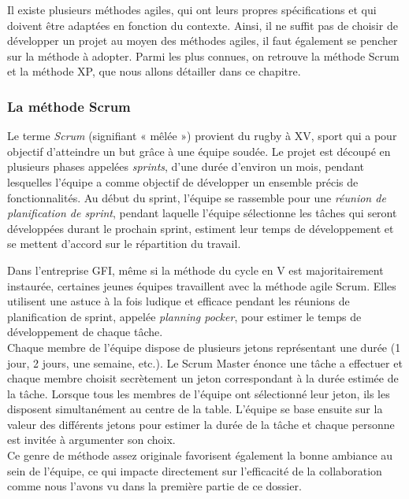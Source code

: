 Il existe plusieurs méthodes agiles, qui ont leurs propres spécifications et qui doivent être adaptées en fonction du contexte. Ainsi, il ne suffit pas de choisir de développer un projet au moyen des méthodes agiles, il faut également se pencher sur la méthode à adopter. Parmi les plus connues, on retrouve la méthode Scrum et la méthode XP, que nous allons détailler dans ce chapitre.

\subsubsection{La méthode Scrum}

Le terme \textit{Scrum} (signifiant « mêlée ») provient du rugby à XV, sport qui a pour objectif d'atteindre un but grâce à une équipe soudée.
Le projet est découpé en plusieurs phases appelées \textit{sprints}, d'une durée d'environ un mois, pendant lesquelles l'équipe a comme objectif de développer un ensemble précis de fonctionnalités.
Au début du sprint, l'équipe se rassemble pour une \textit{réunion de planification de sprint}, pendant laquelle l'équipe sélectionne les tâches qui seront développées durant le prochain sprint, estiment leur temps de développement et se mettent d'accord sur le répartition du travail.

\begin{app}
Dans l'entreprise GFI, même si la méthode du cycle en V est majoritairement instaurée, certaines jeunes équipes travaillent avec la méthode agile Scrum. Elles utilisent une astuce à la fois ludique et efficace pendant les réunions de planification de sprint, appelée \textit{planning pocker}, pour estimer le temps de développement de chaque tâche.\\
Chaque membre de l'équipe dispose de plusieurs jetons représentant une durée (1 jour, 2 jours, une semaine, etc.). Le Scrum Master énonce une tâche a effectuer et chaque membre choisit secrètement un jeton correspondant à la durée estimée de la tâche. Lorsque tous les membres de l'équipe ont sélectionné leur jeton, ils les disposent simultanément au centre de la table. L'équipe se base ensuite sur la valeur des différents jetons pour estimer la durée de la tâche et chaque personne est invitée à argumenter son choix.\\
Ce genre de méthode assez originale favorisent également la bonne ambiance au sein de l'équipe, ce qui impacte directement sur l'efficacité de la collaboration comme nous l'avons vu dans la première partie de ce dossier.
\end{app}

